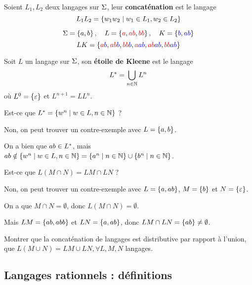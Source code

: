 \begin{definition}
	Soient $L_1, L_2$ deux langages sur $\Sigma$, leur \textbf{concaténation} est le langage
	\[
		L_1L_2 = \left\{w_1w_2 \mid w_1 \in L_1, w_2 \in L_2\right\}
	\]
\end{definition}

\begin{exemple}
	$$ \Sigma = \left\{a, b\right\}, \quad L = \left\{\textcolor{red}{a}, \textcolor{red}{ab}, \textcolor{red}{bb}\right\}, \quad K = \left\{\textcolor{blue}{b}, \textcolor{blue}{ab}\right\} $$
	$$ LK = \left\{\textcolor{red}{a} \textcolor{blue}{b}, \textcolor{red}{ab} \textcolor{blue}{b}, \textcolor{red}{bb} \textcolor{blue}{b}, \textcolor{red}{a} \textcolor{blue}{ab}, \textcolor{red}{ab} \textcolor{blue}{ab}, \textcolor{red}{bb} \textcolor{blue}{ab}\right\} $$
\end{exemple}


\begin{definition}
	Soit $L$ un langage sur $\Sigma$, son \textbf{étoile de Kleene} est le langage
	$$
		L^{*} = \bigcup_{n \in \mathbb{N}} L^n
	$$
	où $L^0 = \left\{\varepsilon\right\}$ et $L^{n+1} = LL^n$.
\end{definition}

\begin{remarque}
	Est-ce que $L^{*} = \left\{w^n \mid w \in L, n \in \mathbb{N}\right\}$ ?

	Non, on peut trouver un contre-exemple avec $L = \left\{a, b\right\}$.

	On a bien que $ab \in L^{*}$, mais $ab \notin \left\{w^n \mid w \in L, n \in \mathbb{N}\right\} = \left\{a^n \mid n \in \mathbb{N}\right\} \cup \left\{b^n \mid n \in \mathbb{N}\right\}$.
\end{remarque}

\begin{remarque}
	Est-ce que $L(M \cap N) = LM \cap LN$ ?

	Non, on peut trouver un contre-exemple avec $L = \left\{a, ab\right\}$, $M = \left\{b\right\}$ et $N = \left\{\varepsilon\right\}$.

	On a que $M \cap N = \emptyset$, donc $L(M \cap N) = \emptyset$.

	Mais $LM = \left\{ab, abb\right\}$ et $LN = \left\{a, ab\right\}$, donc $LM \cap LN = \left\{ab\right\} \neq \emptyset$.
\end{remarque}

\begin{exercice}
	Montrer que la concaténation de langages est distributive par rapport à l'union, \ie que $L(M \cup N) = LM \cup LN, \forall L, M, N$ langages.
\end{exercice}

\subsection{Langages rationnels : définitions}

